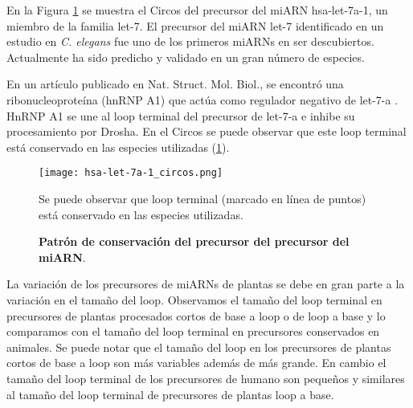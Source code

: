 En la Figura \ref{fig:hsa-let-7a-1_circos} se muestra el Circos del precursor del miARN hsa-let-7a-1, un miembro de la familia let-7.
El precursor del miARN let-7 identificado en un estudio en \textit{C. elegans} fue uno de los primeros miARNs en ser descubiertos.
Actualmente ha sido predicho y validado en un gran número de especies.

En un artículo publicado en Nat. Struct. Mol. Biol., se encontró una ribonucleoproteína (hnRNP A1) que actúa como regulador negativo de let-7-a \citep{pmid20639884}.
HnRNP A1 se une al loop terminal del precursor de let-7-a e inhibe su procesamiento por Drosha.
En el Circos se puede observar que este loop terminal está conservado en las especies utilizadas (\ref{fig:hsa-let-7a-1_circos}).

\begin{figure}[htbp!] 
	\centering    
	\texttt{[image: hsa-let-7a-1\_circos.png]}
	\caption[Patrón de conservación del precursor del precursor del miARN hsa-let-7a-1]{
		\textbf{Patrón de conservación del precursor del precursor del miARN}.
	}
	\label{fig:hsa-let-7a-1_circos}
    Se puede observar que loop terminal (marcado en línea de puntos) está conservado en las especies utilizadas.
\end{figure}

La variación de los precursores de miARNs de plantas se debe en gran parte a la variación en el tamaño del loop.
Observamos el tamaño del loop terminal en precursores de plantas procesados cortos de base a loop o de loop a base y lo comparamos con el tamaño del loop terminal en precursores conservados en animales.
Se puede notar que el tamaño del loop en los precursores de plantas cortos de base a loop son más variables además de más grande.
En cambio el tamaño del loop terminal de los precursores de humano son pequeños y similares al tamaño del loop terminal de precursores de plantas loop a base.


